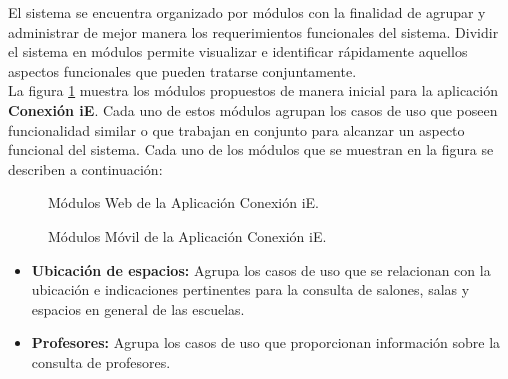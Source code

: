 
	El sistema se encuentra organizado por módulos con la finalidad de agrupar y administrar de mejor manera los requerimientos funcionales del sistema. Dividir el sistema en módulos permite visualizar e identificar rápidamente aquellos aspectos funcionales que pueden tratarse conjuntamente. \\

    La figura \ref{fig:ModulosWeb} muestra los módulos propuestos de manera inicial para la aplicación \textbf{Conexión iE}. Cada uno de estos módulos agrupan los casos de uso que poseen funcionalidad similar o que trabajan en conjunto para alcanzar un aspecto funcional del sistema. Cada uno de los módulos que se muestran en la figura se describen a continuación:


    \begin{figure}[h!]
	\begin{center}
	\caption{Módulos Web de la Aplicación Conexión iE.}
	\label{fig:ModulosWeb}
	\end{center}
    \end{figure}

    \begin{figure}[h!]
	\begin{center}
		\caption{Módulos Móvil de la Aplicación Conexión iE.}
		\label{fig:ModulosMovil}
	\end{center}
\end{figure}


    \begin{itemize}
	\item {\bf Ubicación de espacios:} Agrupa los casos de uso que se relacionan con la ubicación e indicaciones pertinentes para la consulta de salones, salas y espacios en general de las escuelas.

	\item {\bf Profesores:} Agrupa los casos de uso que proporcionan información sobre la consulta de profesores. 



    \end{itemize}

